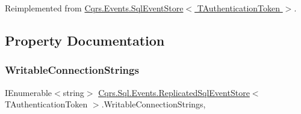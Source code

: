 Reimplemented from \hyperlink{classCqrs_1_1Events_1_1SqlEventStore_a8d67570d50a97050cbce5a29d7a4b9f6_a8d67570d50a97050cbce5a29d7a4b9f6}{Cqrs.\+Events.\+Sql\+Event\+Store$<$ T\+Authentication\+Token $>$}.



\subsection{Property Documentation}
\mbox{\label{classCqrs_1_1Sql_1_1Events_1_1ReplicatedSqlEventStore_af7275b09a11b2c7da447019636a5e0f9_af7275b09a11b2c7da447019636a5e0f9}} 
\subsubsection{\texorpdfstring{Writable\+Connection\+Strings}{WritableConnectionStrings}}
{\footnotesize\ttfamily I\+Enumerable$<$string$>$ \hyperlink{classCqrs_1_1Sql_1_1Events_1_1ReplicatedSqlEventStore}{Cqrs.\+Sql.\+Events.\+Replicated\+Sql\+Event\+Store}$<$ T\+Authentication\+Token $>$.Writable\+Connection\+Strings\hspace{0.3cm}{\ttfamily [get]}, {\ttfamily [protected]}}

